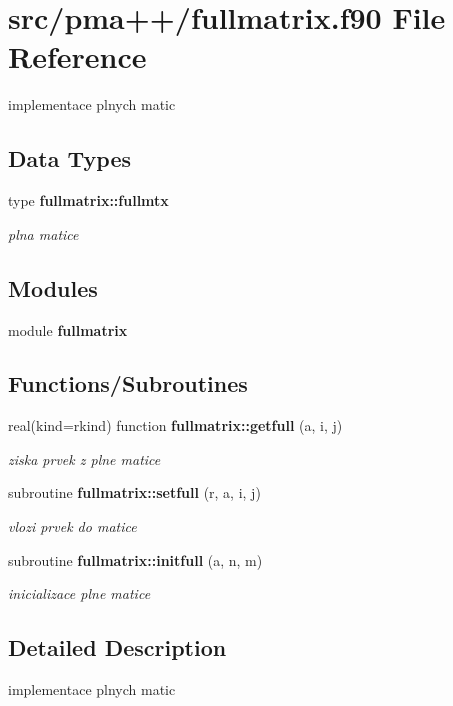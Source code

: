 \section{src/pma++/fullmatrix.f90 File Reference}
\label{fullmatrix_8f90}


implementace plnych matic  


\subsection*{Data Types}
\begin{DoxyCompactItemize}
\item 
type {\bf fullmatrix\+::fullmtx}
\begin{DoxyCompactList}\small\item\em plna matice \end{DoxyCompactList}\end{DoxyCompactItemize}
\subsection*{Modules}
\begin{DoxyCompactItemize}
\item 
module {\bf fullmatrix}
\end{DoxyCompactItemize}
\subsection*{Functions/\+Subroutines}
\begin{DoxyCompactItemize}
\item 
real(kind=rkind) function {\bf fullmatrix\+::getfull} (a, i, j)
\begin{DoxyCompactList}\small\item\em ziska prvek z plne matice \end{DoxyCompactList}\item 
subroutine {\bf fullmatrix\+::setfull} (r, a, i, j)
\begin{DoxyCompactList}\small\item\em vlozi prvek do matice \end{DoxyCompactList}\item 
subroutine {\bf fullmatrix\+::initfull} (a, n, m)
\begin{DoxyCompactList}\small\item\em inicializace plne matice \end{DoxyCompactList}\end{DoxyCompactItemize}


\subsection{Detailed Description}
implementace plnych matic 

